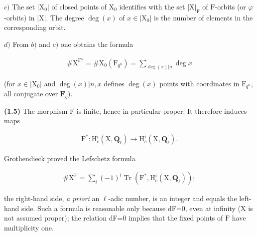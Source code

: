 \documentclass[10pt,leqno]{article}
\begin{document}
\noindent \(c)\) The set |\(\mathrm{X}_{0}|\) of closed points of \(\mathrm{X}_{0}\) identifies with the set |\(\mathrm{X}|_{\mathrm{F}}\) of \(\mathrm{F}\)-orbits (or \(\varphi \)-orbits) in |\(\mathrm{X}|\). The degree \(\operatorname{deg}(x)\) of \(x\in |\mathrm{X}_{0}|\) is the number of elements in the corresponding orbit.\par

\noindent \(d)\) From \(b)\) and \(c)\) one obtains the formula\par

\begin{equation*}\begin{gathered}\# \mathrm{X}^{\mathrm{F}^{n}} = \# \mathrm{X}_{0}(\mathrm{F}_{q^{n}}) = \sum _{\operatorname{deg}(x)|n} \operatorname{deg} x\end{gathered}\tag{1.4.1}\end{equation*}

\noindent (for \(x\in |\mathrm{X}_{0}|\) and \(\operatorname{deg}(x)|n, x\) defines \(\operatorname{deg}(x)\) points with coordinates in \(\mathrm{F}_{q^{n}}\), all conjugate over \(\mathbf{F}_{q})\).\par

\noindent \textbf{(1.5)} The morphism \(\mathrm{F}\) is finite, hence in particular proper. It therefore induces maps\par

\begin{equation*}\begin{gathered}\mathrm{F}^{*} : \mathrm{H}_{c}^{i}(\mathrm{X},\mathbf{Q}_{\ell }) \longrightarrow  \mathrm{H}_{c}^{i}(\mathrm{X},\mathbf{Q}_{\ell }).\end{gathered}\end{equation*}

\noindent Grothendieck proved the Lefschetz formula\par

\begin{equation*}\begin{gathered}\# \mathrm{X}^{\mathrm{F}} = \sum _{i} (- 1)^{i} \operatorname{Tr}(\mathrm{F}^{*},\mathrm{H}_{c}^{i}(\mathrm{X},\mathbf{Q}_{\ell }));\end{gathered}\end{equation*}

\noindent the right-hand side, \emph{a priori} an \(\ell \)-adic number, is an integer and equals the left-hand side. Such a formula is reasonable only because dF=0, even at infinity (\(\mathrm{X}\) is not assumed proper); the relation dF=0 implies that the fixed points of \(\mathrm{F}\) have multiplicity one.\par
\end{document}
